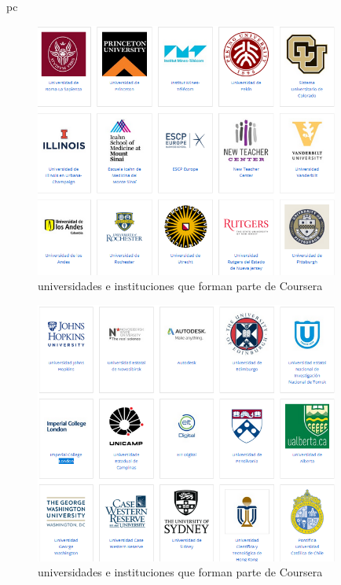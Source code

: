 pc\documentclass[a4paper,12pt,openany]{book}
\begin{document}
\begin{figure}[H]
  \centering
	\includegraphics[width=10cm]{coursera10-1.png}
\caption{universidades e instituciones que forman parte de Coursera}
  \label{fig:cour10-1}
\end{figure}

\begin{figure}[H]
  \centering
	\includegraphics[width=10cm]{coursera10-2.png}
\caption{universidades e instituciones que forman parte de Coursera}
  \label{fig:cour10-2}
\end{figure}
\end{document}
